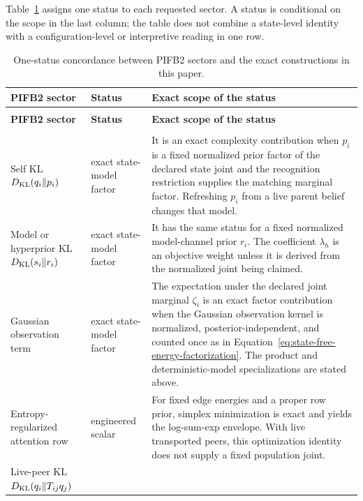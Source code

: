Table~\ref{tab:pifb2-legacy-concordance} assigns one status to each requested sector. A status is conditional on the scope in the last column; the table does not combine a state-level identity with a configuration-level or interpretive reading in one row.

\small
\begin{longtable}{>{\raggedright\arraybackslash}p{}>{\raggedright\arraybackslash}p{}>{\raggedright\arraybackslash}p{}}
\caption{One-status concordance between PIFB2 sectors and the exact constructions in this paper.}
\label{tab:pifb2-legacy-concordance}\\
\toprule
\textbf{PIFB2 sector} & \textbf{Status} & \textbf{Exact scope of the status} \\
\midrule
\endfirsthead
\multicolumn{3}{l}{\textit{Table \thetable\ continued}}\\
\toprule
\textbf{PIFB2 sector} & \textbf{Status} & \textbf{Exact scope of the status} \\
\midrule
\endhead
\midrule
\multicolumn{3}{r}{\textit{Continued on next page}}\\
\endfoot
\bottomrule
\endlastfoot
Self KL \(D_{\mathrm{KL}}(q_i\Vert p_i)\) &
exact state-model factor &
It is an exact complexity contribution when \(p_i\) is a fixed normalized prior factor of the declared state joint and the recognition restriction supplies the matching marginal factor. Refreshing \(p_i\) from a live parent belief changes that model.\\
Model or hyperprior KL \(D_{\mathrm{KL}}(s_i\Vert r_i)\) &
exact state-model factor &
It has the same status for a fixed normalized model-channel prior \(r_i\). The coefficient \(\lambda_h\) is an objective weight unless it is derived from the normalized joint being claimed.\\
Gaussian observation term &
exact state-model factor &
The expectation under the declared joint marginal \(\zeta_i\) is an exact factor contribution when the Gaussian observation kernel is normalized, posterior-independent, and counted once as in Equation~\eqref{eq:state-free-energy-factorization}. The product and deterministic-model specializations are stated above.\\
Entropy-regularized attention row &
engineered scalar &
For fixed edge energies and a proper row prior, simplex minimization is exact and yields the log-sum-exp envelope. With live transported peers, this optimization identity does not supply a fixed population joint.\\
Live-peer KL \(D_{\mathrm{KL}}(q_i\Vert T_{ij}q_j)\) &

\end{longtable}
